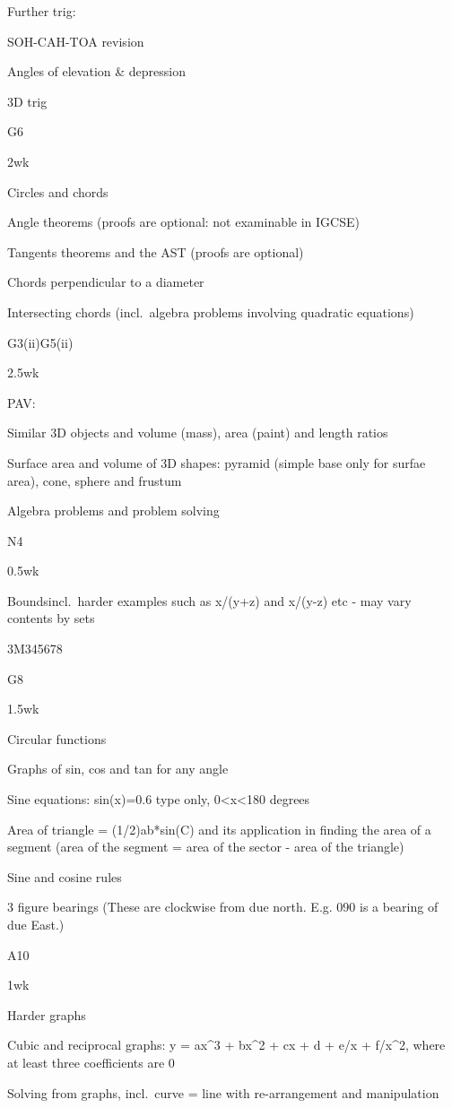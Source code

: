 \documentclass[
]{article}
\begin{document}
Further trig:

SOH-CAH-TOA revision

Angles of elevation \& depression

3D trig

G6

2wk

Circles and chords

Angle theorems (proofs are optional: not examinable in IGCSE)

Tangents theorems and the AST (proofs are optional)

Chords perpendicular to a diameter

Intersecting chords (incl.~algebra problems involving quadratic
equations)

G3(ii)G5(ii)

2.5wk

PAV:

Similar 3D objects and volume (mass), area (paint) and length ratios

Surface area and volume of 3D shapes: pyramid (simple base only for
surfae area), cone, sphere and frustum

Algebra problems and problem solving

N4

0.5wk

Boundsincl.~harder examples such as x/(y+z) and x/(y-z) etc - may vary
contents by sets

3M345678

G8

1.5wk

Circular functions

Graphs of sin, cos and tan for any angle

Sine equations: sin(x)=0.6 type only, 0\textless x\textless180 degrees

Area of triangle = (1/2)ab*sin(C) and its application in finding the
area of a segment (area of the segment = area of the sector - area of
the triangle)

Sine and cosine rules

3 figure bearings (These are clockwise from due north. E.g. 090 is a
bearing of due East.)

A10

1wk

Harder graphs

Cubic and reciprocal graphs: y = ax\^{}3 + bx\^{}2 + cx + d + e/x +
f/x\^{}2, where at least three coefficients are 0

Solving from graphs, incl.~curve = line with re-arrangement and
manipulation
\end{document}
